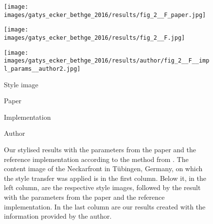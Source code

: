 \begin{figure}[H]
\begin{minipage}[t]{0.24\textwidth}
	\end{minipage}
	\hfill%
	\begin{minipage}[t]{0.24\textwidth}
		\centering
		\texttt{[image: images/gatys\_ecker\_bethge\_2016/results/fig\_2\_\_F\_paper.jpg]}
	\end{minipage}
	\hfill%
	\begin{minipage}[t]{0.24\textwidth}
		\centering
		\texttt{[image: images/gatys\_ecker\_bethge\_2016/results/fig\_2\_\_F.jpg]}
	\end{minipage}
	\hfill%
	\begin{minipage}[t]{0.24\textwidth}
		\centering
		\texttt{[image: images/gatys\_ecker\_bethge\_2016/results/author/fig\_2\_\_F\_\_impl\_params\_\_author2.jpg]}
	\end{minipage}
	\hfill%
	\begin{minipage}[t]{0.24\textwidth}
		\centering
		Style image
	\end{minipage}
	\hfill%
	\begin{minipage}[t]{0.24\textwidth}
		\centering
		Paper
	\end{minipage}
	\hfill%
	\begin{minipage}[t]{0.24\textwidth}
		\centering
		Implementation
	\end{minipage}
	\hfill%
	\begin{minipage}[t]{0.24\textwidth}
		\centering
		Author
	\end{minipage}
	\caption{Our stylised results with the parameters from the paper and the reference implementation according to the method from \cite{GEB2016}. The content image of the Neckarfront in Tübingen, Germany, on which the style transfer was applied is in the first column. Below it, in the left column, are the respective style images, followed by the result with the parameters from the paper and the reference implementation. In the last column are our results created with the information provided by the author.}
	\label{fig:GEB2016_fig_2}
\end{figure}


